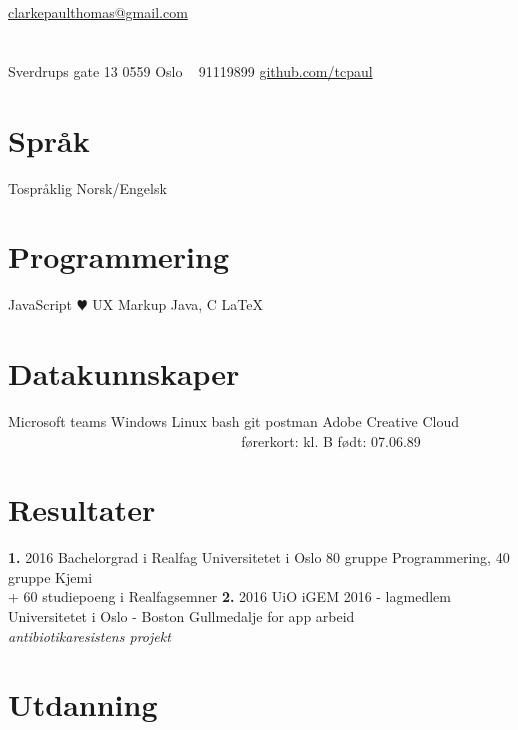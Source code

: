 \documentclass[]{friggeri-cv}
\begin{document}
       {\Letter \href{mailto:clarkepaulthomas@gmail.com}{ clarkepaulthomas@gmail.com}}


\begin{aside}
  \section{}{Sverdrups gate 13 } 
    0559 Oslo
    ~
    {91119899 } \Mobilefone 
    \href{https://github.com/tcpaul}{github.com/tcpaul } \faGithub
  \section{Språk}
    Tospråklig Norsk/Engelsk
  \section{Programmering}
    JavaScript {\color{red} $\varheartsuit$}
    UX Markup
    Java, C
    \LaTeX
  \section{Datakunnskaper}
    Microsoft teams
    Windows
    Linux
    bash
    git
    postman
    Adobe Creative Cloud
    ~
    ~
    ~
    ~
    ~
    ~
    ~
    ~
    ~
    ~
    ~
    ~
    ~
    ~
    ~
    ~
    ~
    ~
    ~
    ~
    ~
    ~
    ~
    ~
    førerkort: kl. B
    født: 07.06.89
\end{aside}

\section{Resultater}

\begin{entrylist}
  \entry
    {\textbf{1.} 2016}
    {Bachelorgrad i Realfag}
    {Universitetet i Oslo}
    {80 gruppe Programmering, 40 gruppe Kjemi\\ + 60 studiepoeng i Realfagsemner}
  \entry
    {\textbf{2.} 2016}
    {UiO iGEM 2016 - lagmedlem}
    {Universitetet i Oslo - Boston}
    {Gullmedalje for app arbeid \\ \emph{antibiotikaresistens projekt}}
\end{entrylist}

\section{Utdanning}
\end{document}
